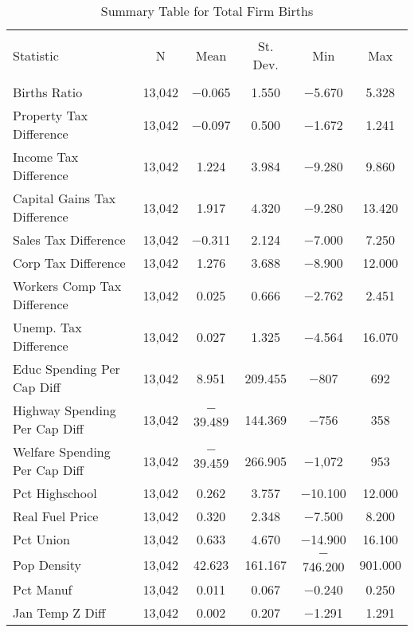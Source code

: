 
\begin{table}[!htbp] \centering 
  \caption{Summary Table for  Total Firm Births} 
  \label{--summary} 
\begin{tabular}{@{\extracolsep{5pt}}lccccc} 
\\[-1.8ex]\hline 
\hline \\[-1.8ex] 
Statistic & \multicolumn{1}{c}{N} & \multicolumn{1}{c}{Mean} & \multicolumn{1}{c}{St. Dev.} & \multicolumn{1}{c}{Min} & \multicolumn{1}{c}{Max} \\ 
\hline \\[-1.8ex] 
Births Ratio & 13,042 & $-$0.065 & 1.550 & $-$5.670 & 5.328 \\ 
Property Tax Difference & 13,042 & $-$0.097 & 0.500 & $-$1.672 & 1.241 \\ 
Income Tax Difference & 13,042 & 1.224 & 3.984 & $-$9.280 & 9.860 \\ 
Capital Gains Tax Difference & 13,042 & 1.917 & 4.320 & $-$9.280 & 13.420 \\ 
Sales Tax Difference & 13,042 & $-$0.311 & 2.124 & $-$7.000 & 7.250 \\ 
Corp Tax Difference & 13,042 & 1.276 & 3.688 & $-$8.900 & 12.000 \\ 
Workers Comp Tax Difference & 13,042 & 0.025 & 0.666 & $-$2.762 & 2.451 \\ 
Unemp. Tax Difference & 13,042 & 0.027 & 1.325 & $-$4.564 & 16.070 \\ 
Educ Spending Per Cap Diff & 13,042 & 8.951 & 209.455 & $-$807 & 692 \\ 
Highway Spending Per Cap Diff & 13,042 & $-$39.489 & 144.369 & $-$756 & 358 \\ 
Welfare Spending Per Cap Diff & 13,042 & $-$39.459 & 266.905 & $-$1,072 & 953 \\ 
Pct Highschool & 13,042 & 0.262 & 3.757 & $-$10.100 & 12.000 \\ 
Real Fuel Price & 13,042 & 0.320 & 2.348 & $-$7.500 & 8.200 \\ 
Pct Union & 13,042 & 0.633 & 4.670 & $-$14.900 & 16.100 \\ 
Pop Density & 13,042 & 42.623 & 161.167 & $-$746.200 & 901.000 \\ 
Pct Manuf & 13,042 & 0.011 & 0.067 & $-$0.240 & 0.250 \\ 
Jan Temp Z Diff & 13,042 & 0.002 & 0.207 & $-$1.291 & 1.291 \\ 

\end{tabular}
\end{table}
